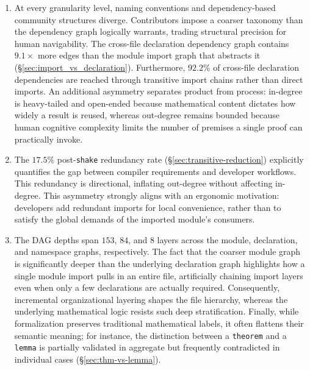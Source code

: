 \begin{enumerate}
\item At every granularity level, naming conventions and dependency-based community structures diverge. Contributors impose a coarser taxonomy than the dependency graph logically warrants, trading structural precision for human navigability. The cross-file declaration dependency graph contains $9.1\times$ more edges than the module import graph that abstracts it (\S\ref{sec:import_vs_declaration}). Furthermore, $92.2\%$ of cross-file declaration dependencies are reached through transitive import chains rather than direct imports. An additional asymmetry separates product from process: in-degree is heavy-tailed and open-ended because mathematical content dictates how widely a result is reused, whereas out-degree remains bounded because human cognitive complexity limits the number of premises a single proof can practically invoke.

\item The $17.5\%$ post-\texttt{shake} redundancy rate (\S\ref{sec:transitive-reduction}) explicitly quantifies the gap between compiler requirements and developer workflows. This redundancy is directional, inflating out-degree without affecting in-degree. This asymmetry strongly aligns with an ergonomic motivation: developers add redundant imports for local convenience, rather than to satisfy the global demands of the imported module's consumers.

\item The DAG depths span $153$, $84$, and $8$ layers across the module, declaration, and namespace graphs, respectively. The fact that the coarser module graph is significantly deeper than the underlying declaration graph highlights how a single module import pulls in an entire file, artificially chaining import layers even when only a few declarations are actually required. Consequently, incremental organizational layering shapes the file hierarchy, whereas the underlying mathematical logic resists such deep stratification. Finally, while formalization preserves traditional mathematical labels, it often flattens their semantic meaning; for instance, the distinction between a \texttt{theorem} and a \texttt{lemma} is partially validated in aggregate but frequently contradicted in individual cases (\S\ref{sec:thm-vs-lemma}).
\end{enumerate}

